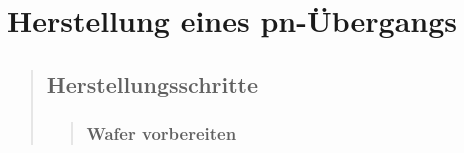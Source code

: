 \section{Herstellung eines pn-Übergangs}
\begin{quote}

	\subsection{Herstellungsschritte}
	\begin{quote}
	
		\subsubsection{Wafer vorbereiten}
        \begin{quote}
% 			
% 
% 			
% 			
% 			
%             
%             
%             

\end{quote}
\end{quote}
\end{quote}
